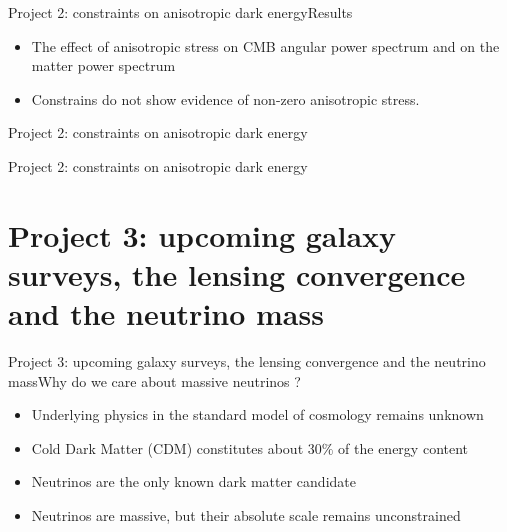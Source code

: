 \documentclass{beamer}
\begin{document}
\begin{frame}{Project 2: constraints on anisotropic dark energy}{Results}
\begin{itemize}
\item The effect of anisotropic stress on CMB angular power spectrum and on the matter power spectrum
\item Constrains do not show evidence of non-zero anisotropic stress. 
\end{itemize}
\end{frame}

\begin{frame}{Project 2: constraints on anisotropic dark energy}

\end{frame}

\begin{frame}{Project 2: constraints on anisotropic dark energy}

\end{frame}

\section{Project 3: upcoming galaxy surveys, the lensing convergence and the neutrino mass}

\begin{frame}{Project 3: upcoming galaxy surveys, the lensing convergence and the neutrino mass}{Why do we care about massive neutrinos ?}
\begin{itemize}
\item Underlying physics in the standard model of cosmology remains unknown
\item Cold Dark Matter (CDM) constitutes  about $30\%$ of the energy content
\item Neutrinos are the only known dark matter candidate
\item Neutrinos are massive, but their absolute scale remains unconstrained
\end{itemize}
\end{frame}
\end{document}
